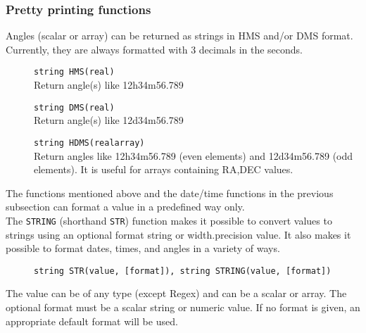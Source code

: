 \subsubsection{Pretty printing functions}
Angles (scalar or array) can be returned as strings in HMS and/or DMS
format. Currently, they are always formatted with 3 decimals in the seconds.
\begin{description}
  \item[] \texttt{string HMS(real)}\\
    Return angle(s) like 12h34m56.789
  \item[] \texttt{string DMS(real)}\\
    Return angle(s) like 12d34m56.789
  \item[] \texttt{string HDMS(realarray)}\\
    Return angles like 12h34m56.789 (even elements) and 12d34m56.789
    (odd elements). It is useful for arrays containing RA,DEC values.
\end{description}
The functions mentioned above and the date/time functions in the previous
subsection can format a value in a predefined way only.
\\The \texttt{STRING} (shorthand \texttt{STR}) function makes it possible to convert values to
strings using an optional format string or width.precision
value. It also makes it possible to format dates, times, and angles
in a variety of ways.
\begin{description}
  \item[] \texttt{string STR(value, [format]),    string STRING(value, [format])}
\end{description}
The value can be of any type (except Regex) and can be a scalar or
array. The optional format must be a scalar string or numeric value.
If no format is given, an appropriate default format will be used.
